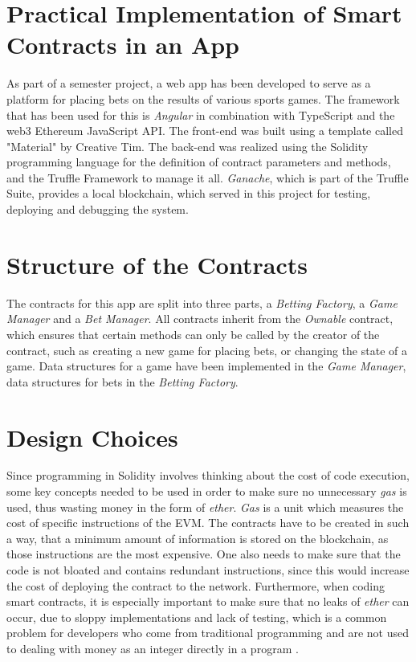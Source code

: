 \section{Practical Implementation of Smart Contracts in an App} 
As part of a semester project, a web app has been developed to serve as a platform for placing bets on the results of various sports games. The framework that has been used for this is \emph{Angular} in combination with TypeScript and the web3 Ethereum JavaScript API. The front-end was built using a template called "Material" by Creative Tim. The back-end was realized using the Solidity programming language for the definition of contract parameters and methods, and the Truffle Framework to manage it all. \emph{Ganache}, which is part of the Truffle Suite, provides a local blockchain, which served in this project for testing, deploying and debugging the system.
\section*{Structure of the Contracts}
The contracts for this app are split into three parts, a \emph{Betting Factory}, a \emph{Game Manager} and a \emph{Bet Manager}. All contracts inherit from the \emph{Ownable} contract, which ensures that certain methods can only be called by the creator of the contract, such as creating a new game for placing bets, or changing the state of a game. Data structures for a game have been implemented in the \emph{Game Manager}, data structures for bets in the \emph{Betting Factory}.
\section*{Design Choices}
\label{sec:design_choices}
Since programming in Solidity involves thinking about the cost of code execution, some key concepts needed to be used in order to make sure no unnecessary \emph{gas} is used, thus wasting money in the form of \emph{ether}. \emph{Gas} is a unit which measures the cost of specific instructions of the EVM. The contracts have to be created in such a way, that a minimum amount of information is stored on the blockchain, as those instructions are the most expensive. One also needs to make sure that the code is not bloated and contains redundant instructions, since this would increase the cost of deploying the contract to the network. Furthermore, when coding smart contracts, it is especially important to make sure that no leaks of \emph{ether} can occur, due to sloppy implementations and lack of testing, which is a common problem for developers who come from traditional programming and are not used to dealing with money as an integer directly in a program \cite{delmolino2016step}.

